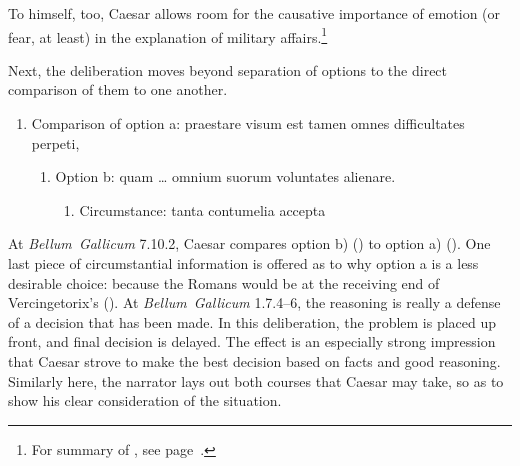 \documentclass[12pt,letterpaper,oneside,final]{memoir}
\begin{document}
 To himself, too, Caesar allows room for the causative importance of emotion (or fear, at least) in the explanation of military affairs.\footnote{For summary of \textcite{lendon1999}, see page~\pageref{lendon-sum}.}

Next, the deliberation moves beyond separation of options to the direct comparison of them to one another.  \begin{latin} \begin{enumerate} \SingleSpacing
\item Comparison of option a: \textlatin{praestare visum est tamen omnes difficultates perpeti,}
  \begin{enumerate}
  \item Option b: \textlatin{quam \ldots{} omnium suorum voluntates alienare.}
    \begin{enumerate}
    \item Circumstance: \textlatin{tanta contumelia accepta}
    \end{enumerate}
  \end{enumerate}
\end{enumerate} \DoubleSpacing \end{latin} At \emph{Bellum~Gallicum} 7.10.2, Caesar compares option b) () to option a) (). One last piece of circumstantial information is offered as to why option a is a less desirable choice: because the Romans would be at the receiving end of Vercingetorix's  (). At \emph{Bellum~Gallicum} 1.7.4--6, the reasoning is really a defense of a decision that has been made. In this deliberation, the problem is placed up front, and final decision is delayed. The effect is an especially strong impression that Caesar strove to make the best decision based on facts and good reasoning. Similarly here, the narrator lays out both courses that Caesar may take, so as to show his clear consideration of the situation.
\end{document}

